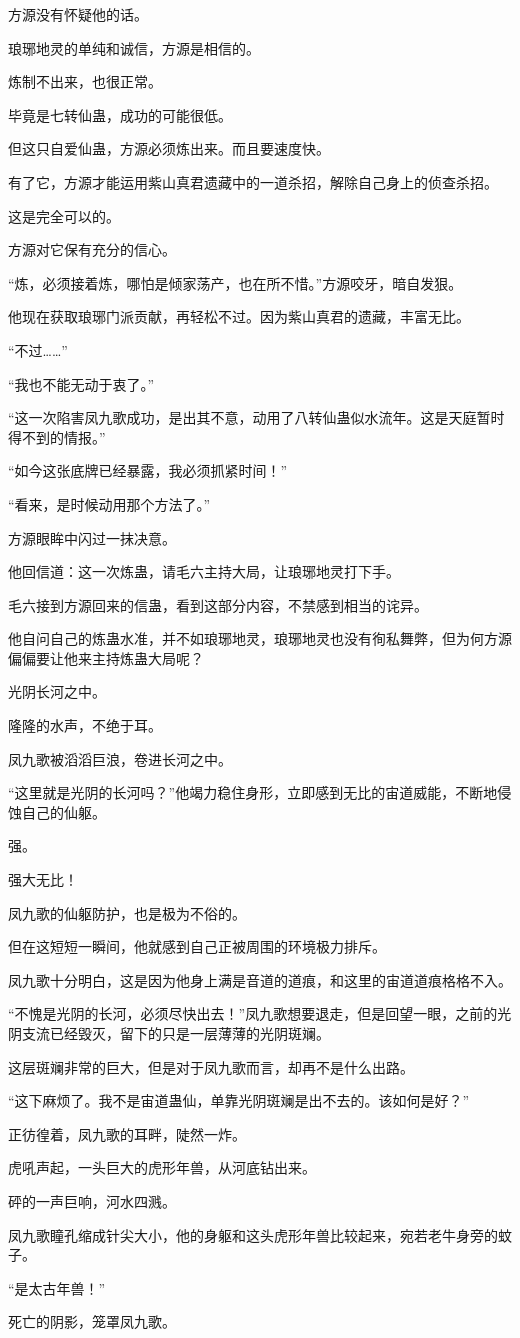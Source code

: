 \begin{this_body}
方源没有怀疑他的话。

琅琊地灵的单纯和诚信，方源是相信的。

炼制不出来，也很正常。

毕竟是七转仙蛊，成功的可能很低。

但这只自爱仙蛊，方源必须炼出来。而且要速度快。

有了它，方源才能运用紫山真君遗藏中的一道杀招，解除自己身上的侦查杀招。

这是完全可以的。

方源对它保有充分的信心。

“炼，必须接着炼，哪怕是倾家荡产，也在所不惜。”方源咬牙，暗自发狠。

他现在获取琅琊门派贡献，再轻松不过。因为紫山真君的遗藏，丰富无比。

“不过……”

“我也不能无动于衷了。”

“这一次陷害凤九歌成功，是出其不意，动用了八转仙蛊似水流年。这是天庭暂时得不到的情报。”

“如今这张底牌已经暴露，我必须抓紧时间！”

“看来，是时候动用那个方法了。”

方源眼眸中闪过一抹决意。

他回信道：这一次炼蛊，请毛六主持大局，让琅琊地灵打下手。

毛六接到方源回来的信蛊，看到这部分内容，不禁感到相当的诧异。

他自问自己的炼蛊水准，并不如琅琊地灵，琅琊地灵也没有徇私舞弊，但为何方源偏偏要让他来主持炼蛊大局呢？

光阴长河之中。

隆隆的水声，不绝于耳。

凤九歌被滔滔巨浪，卷进长河之中。

“这里就是光阴的长河吗？”他竭力稳住身形，立即感到无比的宙道威能，不断地侵蚀自己的仙躯。

强。

强大无比！

凤九歌的仙躯防护，也是极为不俗的。

但在这短短一瞬间，他就感到自己正被周围的环境极力排斥。

凤九歌十分明白，这是因为他身上满是音道的道痕，和这里的宙道道痕格格不入。

“不愧是光阴的长河，必须尽快出去！”凤九歌想要退走，但是回望一眼，之前的光阴支流已经毁灭，留下的只是一层薄薄的光阴斑斓。

这层斑斓非常的巨大，但是对于凤九歌而言，却再不是什么出路。

“这下麻烦了。我不是宙道蛊仙，单靠光阴斑斓是出不去的。该如何是好？”

正彷徨着，凤九歌的耳畔，陡然一炸。

虎吼声起，一头巨大的虎形年兽，从河底钻出来。

砰的一声巨响，河水四溅。

凤九歌瞳孔缩成针尖大小，他的身躯和这头虎形年兽比较起来，宛若老牛身旁的蚊子。

“是太古年兽！”

死亡的阴影，笼罩凤九歌。

\end{this_body}


